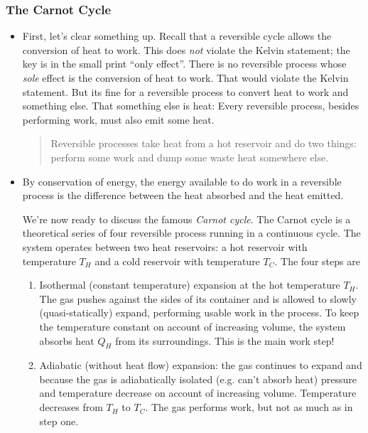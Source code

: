 \documentclass[11pt, a4paper]{article}
\begin{document}
\subsubsection{The Carnot Cycle}
\begin{itemize}
	\item First, let's clear something up. Recall that a reversible cycle allows the conversion of heat to work. This does \textit{not} violate the Kelvin statement; the key is in the small print ``only effect''. There is no reversible process whose \textit{sole} effect is the conversion of heat to work. That would violate the Kelvin statement. But its fine for a reversible process to convert heat to work and something else. That something else is heat: Every reversible process, besides performing work, must also emit some heat. 
	
	\begin{quote}
		Reversible processes take heat from a hot reservoir and do two things: perform some work and dump some waste heat somewhere else. 
	\end{quote} 
	
	\item By conservation of energy, the energy available to do work in a reversible process is the difference between the heat absorbed and the heat emitted. 
	
	We're now ready to discuss the famous \textit{Carnot cycle}. The Carnot cycle is a theoretical series of four reversible process running in a continuous cycle. The system operates between two heat reservoirs: a hot reservoir with temperature $ T_{H} $ and a cold reservoir with temperature $ T_{C} $. The four steps are
	\begin{enumerate}
		\item Isothermal (constant temperature) expansion at the hot temperature $ T_{H} $. The gas pushes against the sides of its container and is allowed to slowly (quasi-statically) expand, performing usable work in the process. To keep the temperature constant on account of increasing volume, the system absorbs heat $ Q_{H} $ from its surroundings. This is the main work step!
		
		\item Adiabatic (without heat flow) expansion: the gas continues to expand and because the gas is adiabatically isolated (e.g. can't absorb heat) pressure and temperature decrease on account of increasing volume. Temperature decreases from $ T_{H} $ to $ T_{C} $. The gas performs work, but not as much as in step one.
		

\end{enumerate}
\end{itemize}
\end{document}
